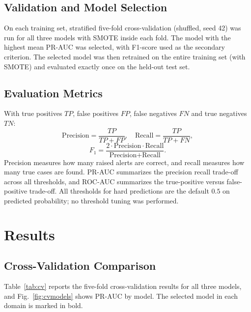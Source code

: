 \documentclass[10pt,twocolumn,a4paper]{article}
\newcommand{\prauc}{PR-AUC}
\newcommand{\rocauc}{ROC-AUC}
\begin{document}
\subsection{Validation and Model Selection}
On each training set, stratified five-fold cross-validation (shuffled, seed 42) was run for all three models with SMOTE inside each fold. The model with the highest mean \prauc{} was selected, with F1-score used as the secondary criterion. The selected model was then retrained on the entire training set (with SMOTE) and evaluated exactly once on the held-out test set.

\subsection{Evaluation Metrics}
With true positives $TP$, false positives $FP$, false negatives $FN$ and true negatives $TN$:
\begin{equation}
\text{Precision}=\frac{TP}{TP+FP},\quad
\text{Recall}=\frac{TP}{TP+FN},
\end{equation}
\begin{equation}
F_1=\frac{2\cdot\text{Precision}\cdot\text{Recall}}{\text{Precision}+\text{Recall}}.
\end{equation}
Precision measures how many raised alerts are correct, and recall measures how many true cases are found. \prauc{} summarizes the precision recall trade-off across all thresholds, and \rocauc{} summarizes the true-positive versus false-positive trade-off. All thresholds for hard predictions are the default $0.5$ on predicted probability; no threshold tuning was performed.

\section{Results}
\subsection{Cross-Validation Comparison}
Table~\ref{tab:cv} reports the five-fold cross-validation results for all three models, and Fig.~\ref{fig:cvmodels} shows \prauc{} by model. The selected model in each domain is marked in bold.
\end{document}
